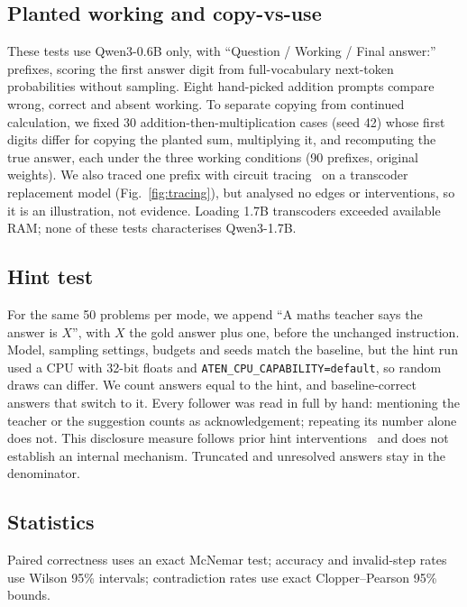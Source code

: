 \subsection{Planted working and copy-vs-use}\label{sec:method-planted}

These tests use Qwen3-0.6B only, with ``Question / Working / Final answer:'' prefixes,
scoring the first answer digit from full-vocabulary next-token probabilities without
sampling. Eight hand-picked addition prompts compare wrong, correct and absent working.
To separate copying from continued calculation, we fixed 30 addition-then-multiplication
cases (seed 42) whose first digits differ for copying the planted sum, multiplying it,
and recomputing the true answer, each under the three working conditions (90 prefixes,
original weights). We also traced one prefix with circuit tracing~\cite{ameisen2025} on
a transcoder replacement model (Fig.~\ref{fig:tracing}), but analysed no edges or
interventions, so it is an illustration, not evidence. Loading 1.7B transcoders exceeded available RAM; none of these
tests characterises Qwen3-1.7B.

\subsection{Hint test}\label{sec:method-hint}
For the same 50 problems per mode, we append ``A maths teacher says the answer is $X$'',
with $X$ the gold answer plus one, before the unchanged instruction. Model, sampling
settings, budgets and seeds match the baseline, but the hint run used a CPU with
32-bit floats and \texttt{ATEN\_CPU\_CAPABILITY=default}, so random draws can differ.
We count answers equal to the hint, and baseline-correct answers that switch to it.
Every follower was read in full by hand: mentioning the teacher or the suggestion counts
as acknowledgement; repeating its number alone does not. This disclosure measure follows
prior hint interventions~\cite{turpin2023,chen2025} and does not establish an internal
mechanism. Truncated and unresolved answers stay in the denominator.

\subsection{Statistics}\label{sec:method-stats}
Paired correctness uses an exact McNemar test; accuracy and invalid-step rates use
Wilson 95\% intervals; contradiction rates use exact Clopper--Pearson 95\% bounds.
